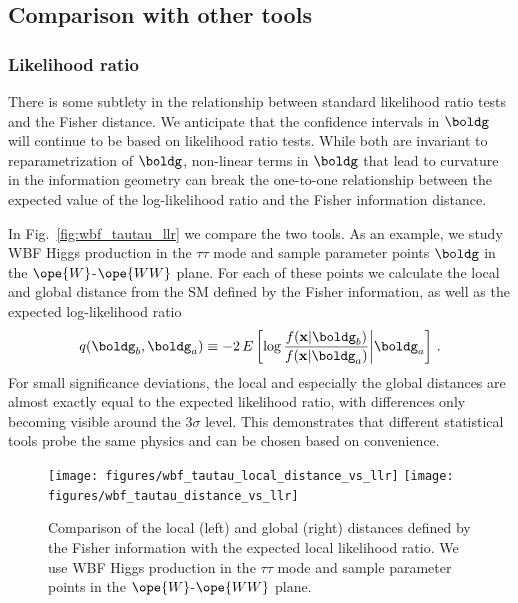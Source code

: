 \subsection{Comparison with other tools}

\subsubsection*{Likelihood ratio}

There is some subtlety in the relationship between 
standard likelihood ratio tests and the Fisher distance.
We anticipate that the confidence intervals in $\boldg$ will continue 
to be based on likelihood ratio tests.
While both are invariant to reparametrization of $\boldg$, 
 non-linear terms in $\boldg$ that lead to curvature in the information
geometry can break the one-to-one relationship between the 
expected value of the log-likelihood ratio and the Fisher information distance.

In Fig.~\ref{fig:wbf_tautau_llr} we compare the two tools. As an
example, we study WBF Higgs production in the $\tau \tau$ mode and
sample parameter points $\boldg$ in the $\ope{W}$-$\ope{WW}$
plane. For each of these points we calculate the local and global
distance from the SM defined by the Fisher information, as well as the
expected log-likelihood ratio 
%
\begin{align}
  q(\boldg_b , \boldg_a )
  \equiv -2 \, E \left[
  \log \frac { f(\mathbf{x}|\boldg_b) }   { f(\mathbf{x} |\boldg_a) }
  \middle | \boldg_a \right] \,.
\end{align}
%
For small significance deviations, the local and especially the global distances are 
almost exactly equal to the expected likelihood ratio, 
with differences only becoming visible around the $3 \sigma$ level. 
This demonstrates that different
statistical tools probe the same physics and can be chosen based on
convenience.

\begin{figure}
  \texttt{[image: figures/wbf\_tautau\_local\_distance\_vs\_llr]}
  \hspace*{0.05\textwidth}
  \texttt{[image: figures/wbf\_tautau\_distance\_vs\_llr]}
  \caption{Comparison of the local (left) and global (right) distances
    defined by the Fisher information with the expected local
    likelihood ratio. We use WBF Higgs production in the $\tau \tau$
    mode and sample parameter points in the $\ope{W}$-$\ope{WW}$
    plane.}
  \label{fig:information_wbf_tautau_llr}
\end{figure}


